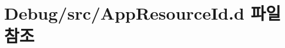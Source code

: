 \hypertarget{_app_resource_id_8d}{\section{Debug/src/\+App\+Resource\+Id.d 파일 참조}
\label{_app_resource_id_8d}
}
